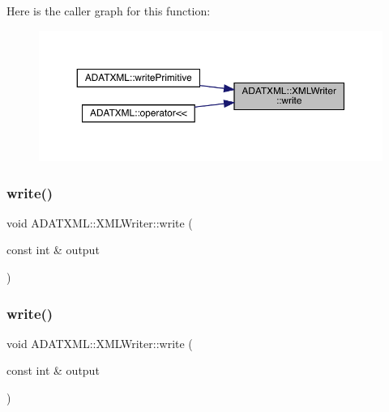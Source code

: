 Here is the caller graph for this function\+:
\nopagebreak
\begin{figure}[H]
\begin{center}
\leavevmode
\includegraphics[width=350pt]{da/da7/classADATXML_1_1XMLWriter_a82f1a99241ecd26ea2bd7f3d87364ed7_icgraph}
\end{center}
\end{figure}
\mbox{\label{classADATXML_1_1XMLWriter_aa027c8bf616bdc96982bb11a2610469e}} 
\subsubsection{\texorpdfstring{write()}{write()}\hspace{0.1cm}{\footnotesize\ttfamily [4/30]}}
{\footnotesize\ttfamily void A\+D\+A\+T\+X\+M\+L\+::\+X\+M\+L\+Writer\+::write (\begin{DoxyParamCaption}\item[{const int \&}]{output }\end{DoxyParamCaption})}

\mbox{\label{classADATXML_1_1XMLWriter_aa027c8bf616bdc96982bb11a2610469e}} 
\subsubsection{\texorpdfstring{write()}{write()}\hspace{0.1cm}{\footnotesize\ttfamily [5/30]}}
{\footnotesize\ttfamily void A\+D\+A\+T\+X\+M\+L\+::\+X\+M\+L\+Writer\+::write (\begin{DoxyParamCaption}\item[{const int \&}]{output }\end{DoxyParamCaption})}

